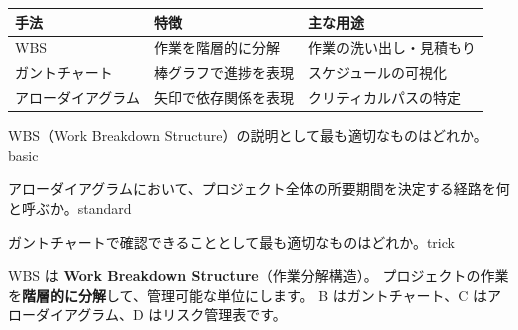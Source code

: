 \begin{comparison}
\begin{tabularx}{\textwidth}{lXX}
  \toprule
  \textbf{手法} & \textbf{特徴} & \textbf{主な用途} \\
  \midrule
  WBS & 作業を階層的に分解 & 作業の洗い出し・見積もり \\
  ガントチャート & 棒グラフで進捗を表現 & スケジュールの可視化 \\
  アローダイアグラム & 矢印で依存関係を表現 & クリティカルパスの特定 \\
  \bottomrule
\end{tabularx}
\end{comparison}


\begin{mondai}{WBS（Work Breakdown Structure）の説明として最も適切なものはどれか。}{basic}
\end{mondai}

\begin{mondai}{アローダイアグラムにおいて、プロジェクト全体の所要期間を決定する経路を何と呼ぶか。}{standard}
\end{mondai}

\begin{mondai}{ガントチャートで確認できることとして最も適切なものはどれか。}{trick}
\end{mondai}

\kaitoupage

\begin{kaisetsu}
WBS は \textbf{Work Breakdown Structure}（作業分解構造）。
プロジェクトの作業を\textbf{階層的に分解}して、管理可能な単位にします。
B はガントチャート、C はアローダイアグラム、D はリスク管理表です。
\end{kaisetsu}

